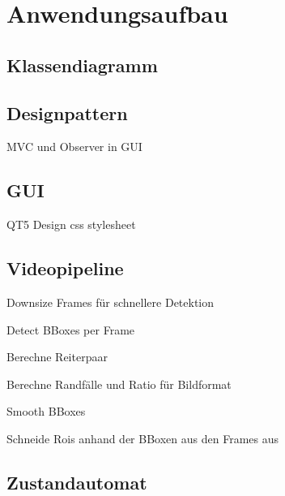 \chapter{Anwendungsaufbau}
\label{ch:anwendungsaufbau}

\section{Klassendiagramm}
\section{Designpattern}
MVC und Observer in GUI
\section{GUI}
QT5
Design css stylesheet
\section{Videopipeline}
Downsize Frames für schnellere Detektion

Detect BBoxes per Frame

Berechne Reiterpaar

Berechne Randfälle und Ratio für Bildformat

Smooth BBoxes

Schneide Rois anhand der BBoxen aus den Frames aus


\section{Zustandautomat}


